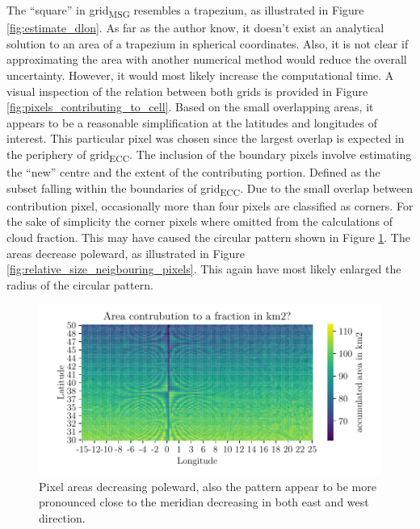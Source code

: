 The ``square'' in grid\textsubscript{MSG} resembles a trapezium, as illustrated in Figure \ref{fig:estimate_dlon}. As far as the author know, it doesn't exist an analytical solution to an area of a trapezium in spherical coordinates. Also, it is not clear if approximating the area with another numerical method would reduce the overall uncertainty. However, it would most likely increase the computational time. 
A visual inspection of the relation between both grids is provided in 
Figure \ref{fig:pixels_contributing_to_cell}. Based on the small overlapping areas, it appears to be a reasonable simplification at the latitudes and longitudes of interest. This particular pixel was chosen since the largest overlap is expected in the periphery of grid\textsubscript{ECC}. The inclusion of the boundary pixels involve estimating the ``new'' centre and the extent of the contributing portion. Defined as the subset falling within the boundaries of grid\textsubscript{ECC}. Due to the small overlap between contribution pixel, occasionally more than four pixels are classified as corners. For the sake of simplicity the corner pixels where omitted from the calculations of cloud fraction. This may have caused the circular pattern shown in Figure \ref{fig:area_pixel_signal}. The areas decrease poleward, as illustrated in Figure \ref{fig:relative_size_neigbouring_pixels}. This again have most likely enlarged the radius of the circular pattern.
\begin{figure}[ht]
    \centering
    \includegraphics{python_figs/signal_area_pixel.pdf}
    \caption{Pixel areas decreasing poleward, also the pattern appear to be more pronounced close to the meridian decreasing in both east and west direction.}
    \label{fig:area_pixel_signal}
\end{figure} 



